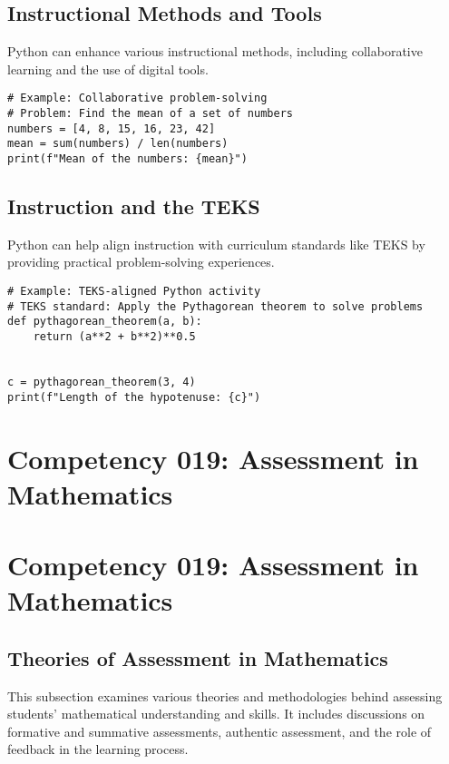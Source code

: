 \documentclass{book}
\begin{document}
\subsection{Instructional Methods and Tools}
Python can enhance various instructional methods, including collaborative learning and the use of digital tools.


\begin{lstlisting}[style=pythonstyle]
# Example: Collaborative problem-solving
# Problem: Find the mean of a set of numbers
numbers = [4, 8, 15, 16, 23, 42]
mean = sum(numbers) / len(numbers)
print(f"Mean of the numbers: {mean}")
\end{lstlisting}


\subsection{Instruction and the TEKS}
Python can help align instruction with curriculum standards like TEKS by providing practical problem-solving experiences.


\begin{lstlisting}[style=pythonstyle]
# Example: TEKS-aligned Python activity
# TEKS standard: Apply the Pythagorean theorem to solve problems
def pythagorean_theorem(a, b):
    return (a**2 + b**2)**0.5


c = pythagorean_theorem(3, 4)
print(f"Length of the hypotenuse: {c}")
\end{lstlisting}


\section{Competency 019: Assessment in Mathematics}


\section{Competency 019: Assessment in Mathematics}


\subsection{Theories of Assessment in Mathematics}
This subsection examines various theories and methodologies behind assessing students' mathematical understanding and skills. It includes discussions on formative and summative assessments, authentic assessment, and the role of feedback in the learning process.
\end{document}
